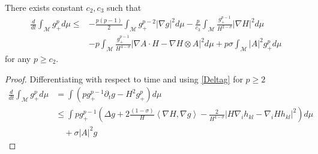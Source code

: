\begin{lemma}\label{dgdt}
   There exists constant $ c_{2} , c_{3}$ such that 
    \begin{align}
        \frac{d}{dt}\int_{ \mathcal{M}} g_{+}^{p} d \mu \le& - \frac{p(p-1)}{2} \int_{ \mathcal{M}} g_{+}^{p-2}| \nabla g|^{2}d \mu - \frac{p}{c_{3}} \int_{ \mathcal{M}} \frac{g_{+}^{p-1}}{H^{2 -\sigma}}|\nabla H|^{2} d \mu \nonumber\\
        & - p \int_{ \mathcal{M}} \frac{g_{+}^{p-1}}{H^{4-\sigma}}| \nabla A \cdot H - \nabla H \otimes A|^{2} d \mu + p \sigma \int_{ \mathcal{ M}}|A|^{2} g_{+}^{p} d \mu \label{Lpfirst}
    \end{align}
   for any $ p \ge c_{2} $.
\end{lemma}

\begin{proof}
    Differentiating with respect to time and using \cref{Deltag} for $ p \ge 2 $
    \begin{align}
        \frac{d}{dt} \int_{ \mathcal{M}} g_{+}^{p} d \mu  & =  \int \left(pg_{+}^{p-1} \partial_{t}g - H^{2}g_{+}^{p}\right) d \mu \nonumber \\
        & \le \int pg_{+}^{p-1}\left( \Delta g + 2\frac{(1-\sigma)}{H}\left< \nabla H, \nabla g\right>  - \frac{2}{H^{4-\sigma}}|H \nabla_{i}h_{kl} - \nabla_{i}Hh_{kl}|^{2}\right)d \mu  \nonumber\\
        & \quad + \sigma |A|^{2} g \label{Lpg}
    \end{align}


\end{proof}
